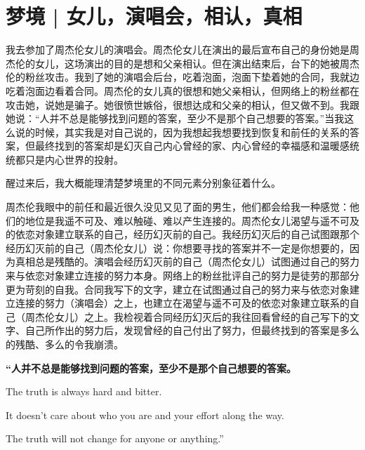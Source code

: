 \chapter{梦境 | 女儿，演唱会，相认，真相}




我去参加了周杰伦女儿的演唱会。周杰伦女儿在演出的最后宣布自己的身份\pozhehao{}她是周杰伦的女儿，这场演出的目的是想和父亲相认。但在演出结束后，台下的她被周杰伦的粉丝攻击。我到了她的演唱会后台，吃着泡面，泡面下垫着她的合同，我就边吃着泡面边看着合同。周杰伦的女儿真的很想和她父亲相认，但网络上的粉丝都在攻击她，说她是骗子。她很愤世嫉俗，很想达成和父亲的相认，但又做不到。我跟她说：“人并不总是能够找到问题的答案，至少不是那个自己想要的答案。”当我这么说的时候，其实我是对自己说的，因为我想起我想要找到恢复和前任的关系的答案，但最终找到的答案却是幻灭\pozhehao{}自己内心曾经的家、内心曾经的幸福感和温暖感统统都只是内心世界的投射。

醒过来后，我大概能理清楚梦境里的不同元素分别象征着什么。

周杰伦\pozhehao{}我眼中的前任和最近很久没见又见了面的男生，他们都会给我一种感觉：他们的地位是我遥不可及、难以触碰、难以产生连接的。周杰伦女儿\pozhehao{}渴望与遥不可及的依恋对象建立联系的自己，经历幻灭前的自己。我\pozhehao{}经历幻灭后的自己试图跟那个经历幻灭前的自己（周杰伦女儿）说：你想要寻找的答案并不一定是你想要的，因为真相总是残酷的。演唱会\pozhehao{}经历幻灭前的自己（周杰伦女儿）试图通过自己的努力来与依恋对象建立连接的努力本身。网络上的粉丝\pozhehao{}批评自己的努力是徒劳的那部分更为苛刻的自我。合同\pozhehao{}我写下的文字，建立在试图通过自己的努力来与依恋对象建立连接的努力（演唱会）之上，也建立在渴望与遥不可及的依恋对象建立联系的自己（周杰伦女儿）之上。我检视着合同\pozhehao{}经历幻灭后的我往回看曾经的自己写下的文字、自己所作出的努力后，发现曾经的自己付出了努力，但最终找到的答案是多么的残酷、多么的令我崩溃。

\noindent\begin{minipage}{\linewidth}
	\center\bfseries
	“人并不总是能够找到问题的答案，至少不是那个自己想要的答案。

	The truth is always hard and bitter.

	It doesn't care about who you are and your effort along the way.

	The truth will not change for anyone or anything.”
\end{minipage}


